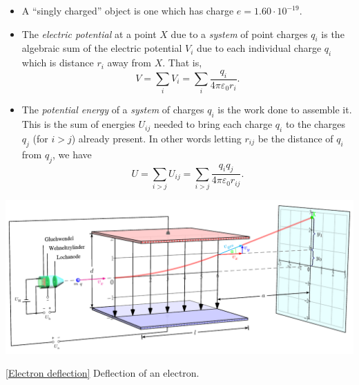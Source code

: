 \documentclass[oneside]{book}
\begin{document}
\begin{itemize}
  \item A ``singly charged'' object is one which has charge \(e=1.60\cdot 10^{-19}\). 
  \item The \emph{electric potential} at a point \(X\) due to a \emph{system} of point charges \(q_i\) is the algebraic sum of the electric potential \(V_i\) due to each individual charge \(q_i\) which is distance \(r_i\) away from \(X\). That is, 
  \[V=\sum_{i}{V_i}=\sum_{i}^{}{\frac{q_i}{4\pi\varepsilon_0r_i}}.\]
  \item The \emph{potential energy} of a \emph{system} of charges \(q_i\) is the work done to assemble it. This is the sum of energies \(U_{ij}\) needed to bring each charge \(q_i\) to the charges \(q_j\) (for \(i>j\)) already present. In other words letting \(r_{ij}\) be the distance of \(q_i\) from \(q_j\), we have 
  \[U=\sum_{i>j}{U_{ij}}=\sum_{i>j}^{}{\frac{q_iq_j}{4\pi\varepsilon_0r_{ij}}}.\] 
\end{itemize}
\begin{center}
    \includegraphics[width=\textwidth]{../images/Electron-Deflection/Bahn-Kondensator (1).pdf}
    \captionsetup{type=figure}
    \caption[figure]{\ref{Electron deflection} Deflection of an electron.}
\end{center}
\end{document}
